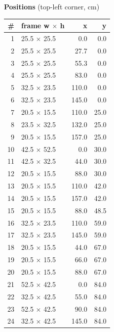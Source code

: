 \documentclass[a4paper,landscape,10pt]{article}
\begin{document}
\begin{minipage}[t]{0.25\textwidth}
\vspace{8pt}
{\bfseries Positions} (top-left corner, cm)\\[2pt]
\tiny
\begin{tabular}{@{}r l r r@{}}
\toprule
\# & frame w $\times$ h & x & y \\
\midrule
1 & 25.5 $\times$ 25.5 & 0.0 & 0.0 \\
2 & 25.5 $\times$ 25.5 & 27.7 & 0.0 \\
3 & 25.5 $\times$ 25.5 & 55.3 & 0.0 \\
4 & 25.5 $\times$ 25.5 & 83.0 & 0.0 \\
5 & 32.5 $\times$ 23.5 & 110.0 & 0.0 \\
6 & 32.5 $\times$ 23.5 & 145.0 & 0.0 \\
7 & 20.5 $\times$ 15.5 & 110.0 & 25.0 \\
8 & 23.5 $\times$ 32.5 & 132.0 & 25.0 \\
9 & 20.5 $\times$ 15.5 & 157.0 & 25.0 \\
10 & 42.5 $\times$ 52.5 & 0.0 & 30.0 \\
11 & 42.5 $\times$ 32.5 & 44.0 & 30.0 \\
12 & 20.5 $\times$ 15.5 & 88.0 & 30.0 \\
13 & 20.5 $\times$ 15.5 & 110.0 & 42.0 \\
14 & 20.5 $\times$ 15.5 & 157.0 & 42.0 \\
15 & 20.5 $\times$ 15.5 & 88.0 & 48.5 \\
16 & 32.5 $\times$ 23.5 & 110.0 & 59.0 \\
17 & 32.5 $\times$ 23.5 & 145.0 & 59.0 \\
18 & 20.5 $\times$ 15.5 & 44.0 & 67.0 \\
19 & 20.5 $\times$ 15.5 & 66.0 & 67.0 \\
20 & 20.5 $\times$ 15.5 & 88.0 & 67.0 \\
21 & 52.5 $\times$ 42.5 & 0.0 & 84.0 \\
22 & 32.5 $\times$ 42.5 & 55.0 & 84.0 \\
23 & 52.5 $\times$ 42.5 & 90.0 & 84.0 \\
24 & 32.5 $\times$ 42.5 & 145.0 & 84.0 \\
\bottomrule
\end{tabular}
\end{minipage}
\clearpage
\end{document}
